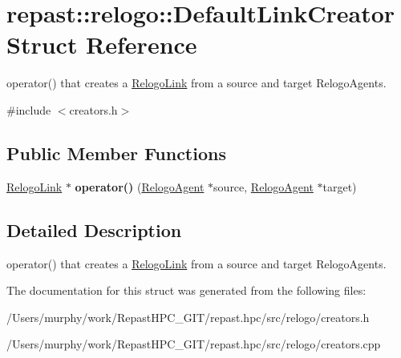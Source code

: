 \hypertarget{structrepast_1_1relogo_1_1_default_link_creator}{\section{repast\-:\-:relogo\-:\-:Default\-Link\-Creator Struct Reference}
\label{structrepast_1_1relogo_1_1_default_link_creator}
}


operator() that creates a \hyperlink{classrepast_1_1relogo_1_1_relogo_link}{Relogo\-Link} from a source and target Relogo\-Agents.  




{\ttfamily \#include $<$creators.\-h$>$}

\subsection*{Public Member Functions}
\begin{DoxyCompactItemize}
\item 
\hypertarget{structrepast_1_1relogo_1_1_default_link_creator_a1ad7ec806173027b48ab7095c442665e}{\hyperlink{classrepast_1_1relogo_1_1_relogo_link}{Relogo\-Link} $\ast$ {\bfseries operator()} (\hyperlink{classrepast_1_1relogo_1_1_relogo_agent}{Relogo\-Agent} $\ast$source, \hyperlink{classrepast_1_1relogo_1_1_relogo_agent}{Relogo\-Agent} $\ast$target)}\label{structrepast_1_1relogo_1_1_default_link_creator_a1ad7ec806173027b48ab7095c442665e}

\end{DoxyCompactItemize}


\subsection{Detailed Description}
operator() that creates a \hyperlink{classrepast_1_1relogo_1_1_relogo_link}{Relogo\-Link} from a source and target Relogo\-Agents. 

The documentation for this struct was generated from the following files\-:\begin{DoxyCompactItemize}
\item 
/\-Users/murphy/work/\-Repast\-H\-P\-C\-\_\-\-G\-I\-T/repast.\-hpc/src/relogo/creators.\-h\item 
/\-Users/murphy/work/\-Repast\-H\-P\-C\-\_\-\-G\-I\-T/repast.\-hpc/src/relogo/creators.\-cpp\end{DoxyCompactItemize}
